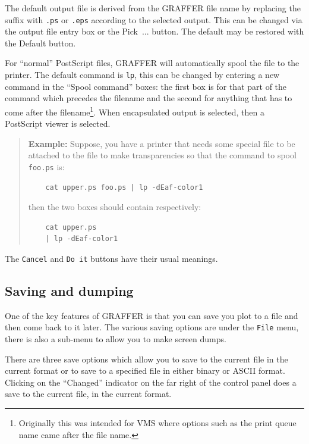\documentclass[11pt,twoside,english]{article}
\begin{document}
 The default output file is derived from the GRAFFER file name by
 replacing the suffix with \texttt{.ps} or \texttt{.eps} according to
 the selected output. This can be changed via the output file entry box
 or the \textsf{Pick~...} button. The default may be restored with the
 \textsf{Default} button.

 For ``normal'' PostScript files, GRAFFER will automatically spool
 the file to the printer. The default command is \texttt{lp}, this can
 be changed by entering a new command in the ``Spool command'' boxes:
 the first box is for that part of the command which precedes the
 filename and the second for anything that has to come after the
 filename\footnote{Originally this was intended for VMS where options
   such as the print queue name came after the file name.}. When
 encapsulated output is selected, then a PostScript viewer is selected.

\begin{quote}
  \textsf{\textbf{Example:}} \textsf{Suppose, you have a printer that
    needs some special file to be attached to the file to make
    transparencies so that the command to spool} \texttt{foo.ps}
  \textsf{is:}
  \begin{verbatim}
    cat upper.ps foo.ps | lp -dEaf-color1
  \end{verbatim}
  \textsf{then the two boxes should contain respectively:}
  \begin{verbatim}
    cat upper.ps
    | lp -dEaf-color1
  \end{verbatim}
\end{quote}
The \texttt{Cancel} and \texttt{Do it} buttons have their usual
meanings.


\subsection{Saving and dumping}

One of the key features of GRAFFER is that you can save you plot to a
file and then come back to it later. The various saving options are
under the \texttt{File} menu, there is also a sub-menu to allow you to
make screen dumps.

There are three save options which allow you to save to the current
file in the current format or to save to a specified file in either
binary or ASCII format. Clicking on the {}``Changed'' indicator on the
far right of the control panel does a save to the current file, in the
current format.
\end{document}
